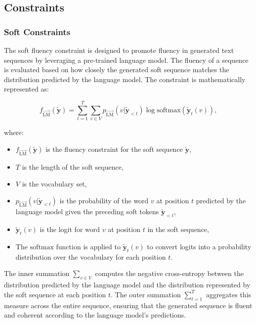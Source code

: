 \documentclass{article}
\begin{document}
\subsection{Constraints}
\subsubsection{Soft Constraints}
The soft fluency constraint is designed to promote fluency in generated text sequences by leveraging a pre-trained language model. The fluency of a sequence is evaluated based on how closely the generated soft sequence matches the distribution predicted by the language model. The constraint is mathematically represented as:

\begin{equation}
    f_{\overrightarrow{\text{LM}}}(\mathbf{\tilde{y}}) = \sum_{t=1}^{T} \sum_{v \in V} p_{\overrightarrow{\text{LM}}}(v|\mathbf{\tilde{y}}_{<t}) \log \text{softmax} (\mathbf{\tilde{y}}_t(v)),
\end{equation}


where:
\begin{itemize}
    \item \(f_{\overrightarrow{\text{LM}}}(\mathbf{\tilde{y}})\) is the fluency constraint for the soft sequence \(\mathbf{\tilde{y}}\),
    \item \(T\) is the length of the soft sequence,
    \item \(V\) is the vocabulary set,
    \item \(p_{\overrightarrow{\text{LM}}}(v|\mathbf{\tilde{y}}_{<t})\) is the probability of the word \(v\) at position \(t\) predicted by the language model given the preceding soft tokens \(\mathbf{\tilde{y}}_{<t}\),
    \item \(\mathbf{\tilde{y}}_t(v)\) is the logit for word \(v\) at position \(t\) in the soft sequence,
    \item The \(\text{softmax}\) function is applied to \(\mathbf{\tilde{y}}_t(v)\) to convert logits into a probability distribution over the vocabulary for each position \(t\).
\end{itemize}


The inner summation \(\sum_{v \in V}\) computes the negative cross-entropy between the distribution predicted by the language model and the distribution represented by the soft sequence at each position \(t\). The outer summation \(\sum_{t=1}^{T}\) aggregates this measure across the entire sequence, ensuring that the generated sequence is fluent and coherent according to the language model's predictions.
\end{document}
